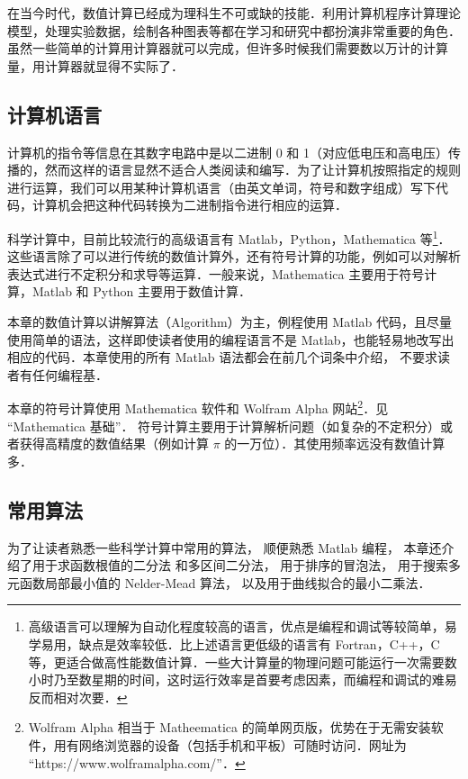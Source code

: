 
在当今时代，数值计算已经成为理科生不可或缺的技能．利用计算机程序计算理论模型，处理实验数据，绘制各种图表等都在学习和研究中都扮演非常重要的角色．虽然一些简单的计算用计算器就可以完成，但许多时候我们需要数以万计的计算量，用计算器就显得不实际了．

\subsection{计算机语言}
计算机的指令等信息在其数字电路中是以二进制 0 和 1（对应低电压和高电压）传播的，然而这样的语言显然不适合人类阅读和编写．为了让计算机按照指定的规则进行运算，我们可以用某种计算机语言（由英文单词，符号和数字组成）写下代码，计算机会把这种代码转换为二进制指令进行相应的运算．

科学计算中，目前比较流行的高级语言有 Matlab，Python，Mathematica 等\footnote{高级语言可以理解为自动化程度较高的语言，优点是编程和调试等较简单，易学易用，缺点是效率较低．比上述语言更低级的语言有 Fortran，C++，C 等，更适合做高性能数值计算．一些大计算量的物理问题可能运行一次需要数小时乃至数星期的时间，这时运行效率是首要考虑因素，而编程和调试的难易反而相对次要．}．这些语言除了可以进行传统的数值计算外，还有符号计算的功能，例如可以对解析表达式进行不定积分和求导等运算．一般来说，Mathematica 主要用于符号计算，Matlab 和 Python 主要用于数值计算．

本章的数值计算以讲解算法（Algorithm）为主，例程使用 Matlab 代码，且尽量使用简单的语法，这样即使读者使用的编程语言不是 Matlab，也能轻易地改写出相应的代码．本章使用的所有 Matlab 语法都会在前几个词条中介绍， 不要求读者有任何编程基．

本章的符号计算使用 Mathematica 软件和 Wolfram Alpha 网站\footnote{Wolfram Alpha 相当于 Matheematica 的简单网页版，优势在于无需安装软件，用有网络浏览器的设备（包括手机和平板）可随时访问．网址为 “https://www.wolframalpha.com/”．}．见 “Mathematica 基础”．%
符号计算主要用于计算解析问题（如复杂的不定积分）或者获得高精度的数值结果（例如计算 $\pi$ 的一万位）．其使用频率远没有数值计算多．

\subsection{常用算法}
为了让读者熟悉一些科学计算中常用的算法， 顺便熟悉 Matlab 编程， 本章还介绍了用于求函数根值的二分法 和多区间二分法， 用于排序的冒泡法， 用于搜索多元函数局部最小值的 Nelder-Mead 算法， 以及用于曲线拟合的最小二乘法．%

